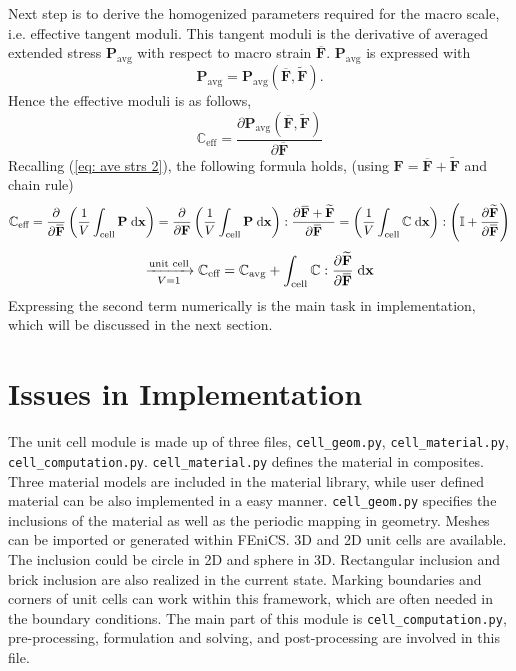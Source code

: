 Next step is to derive the homogenized parameters required for the macro scale, i.e. effective tangent moduli. This tangent moduli is the derivative of averaged extended stress $\mathbf{P}_{\text{avg}}$ with respect to macro strain $\overbar{\mathbf{F}}$. $\mathbf{P}_{\text{avg}}$ is expressed with 
\begin{equation}
\mathbf{P}_{\text{avg}} = \mathbf{P}_{\text{avg}} \left( \overbar{\mathbf{F}}, \widetilde{\mathbf{F}} \right).
\end{equation}
Hence the effective moduli is as follows,
\begin{equation}
\mathbb{C}_{\text{eff}} = \dfrac{\partial \mathbf{P}_{\text{avg}} \left( \overbar{\mathbf{F}}, \widetilde{\mathbf{F}} \right)}{\partial \overbar{\mathbf{F}}}
\end{equation}
Recalling (\ref{eq: ave strs 2}), the following formula holds, (using $\mathbf{F} = \overbar{\mathbf{F}} + \widetilde{\mathbf{F}}$ and chain rule)
\[
\mathbb{C}_{\text{eff}} = \dfrac{\partial}{\partial \overbar{\mathbf{F}}} \left( \dfrac{1}{V} \int_{\text{cell}} \mathbf{P} \myd{\mathbf{x}} \right) = \dfrac{\partial}{\partial \mathbf{F}} \left( \dfrac{1}{V} \int_{\text{cell}} \mathbf{P} \myd{\mathbf{x}} \right) : \dfrac{\partial \overbar{\mathbf{F}} + \widetilde{\mathbf{F}}}{\partial \overbar{\mathbf{F}}} =  \left( \dfrac{1}{V} \int_{\text{cell}}  \mathbb{C} \myd{\mathbf{x}} \right) : \left( \mathbb{I} + \dfrac{\partial \widetilde{\mathbf{F}}}{\partial \overbar{\mathbf{F}}} \right)
\]
\begin{equation}
\label{eq: c eff}
\xrightarrow[ V = 1]{\text{unit cell}} \mathbb{C}_{\text{eff}} = \mathbb{C}_{\text{avg}} + \int_{\text{cell}}  \mathbb{C} : \dfrac{\partial \widetilde{\mathbf{F}}}{\partial \overbar{\mathbf{F}}} \myd{\mathbf{x}} 
\end{equation}
Expressing the second term numerically is the main task in implementation, which will be discussed in the next section.

\section{Issues in Implementation}
The unit cell module is made up of three files, \texttt{cell\_geom.py}, \texttt{cell\_material.py}, \texttt{cell\_computation.py}. \texttt{cell\_material.py} defines the material in composites. Three material models are included in the material library, while user defined material can be also implemented in a easy manner. \texttt{cell\_geom.py} specifies the inclusions of the material as well as the periodic mapping in geometry. Meshes can be imported or generated within FEniCS. 3D and 2D unit cells are available. The inclusion could be circle in 2D and sphere in 3D. Rectangular inclusion and brick inclusion are also realized in the current state. Marking boundaries and corners of unit cells can work within this framework, which are often needed in the boundary conditions. The main part of this module is \texttt{cell\_computation.py}, pre-processing, formulation and solving, and post-processing are involved in this file. 

